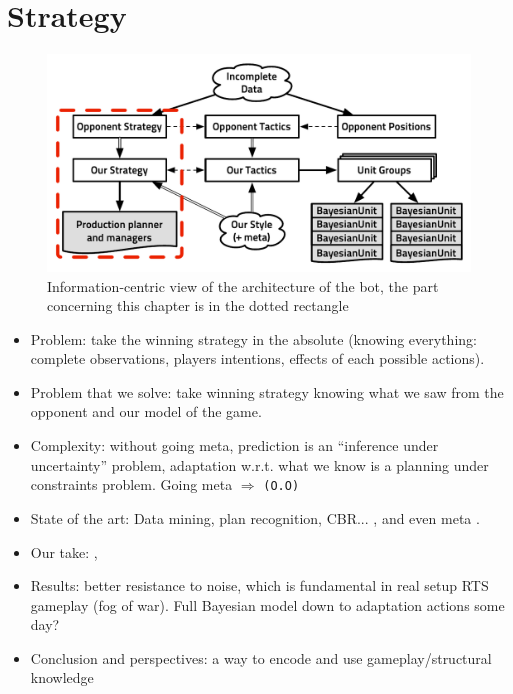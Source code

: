 \chapter{Strategy}
\begin{figure}[!ht]
\begin{center}
\includegraphics[width=13cm]{images/starcraft_bbq_concept_STRATEGY.pdf}
\end{center}
\label{fig:conceptSTRATEGY}
\caption{Information-centric view of the architecture of the bot, the part concerning this chapter is in the dotted rectangle}
\end{figure}
\begin{itemize}
\item Problem: take the winning strategy in the absolute (knowing everything: complete observations, players intentions, effects of each possible actions).
\item Problem that we solve: take winning strategy knowing what we saw from the opponent and our model of the game.
\item Complexity: without going meta, prediction is an ``inference under uncertainty'' problem, adaptation w.r.t. what we know is a planning under constraints problem. Going meta $\Rightarrow$ \texttt{(O.O)}
\item State of the art: Data mining, plan recognition, CBR... \citep{weberStrat}, \citep{Weber2010qf} and even meta \citep{metalevelbehavioradaptrts}.
\item Our take: \citep{SYNNAEVE:OpeningPred}, \citep{SYNNAEVE:StratPred}
\item Results: better resistance to noise, which is fundamental in real setup RTS gameplay (fog of war). Full Bayesian model down to adaptation actions some day?
\item Conclusion and perspectives: a way to encode and use gameplay/structural knowledge 
\end{itemize}

